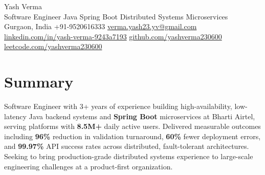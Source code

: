 \documentclass[letterpaper,11pt]{article}
\begin{document}
\begin{center}
  {\Huge Yash Verma} \\
  \small Software Engineer \textperiodcentered{} Java \textperiodcentered{} Spring Boot \textperiodcentered{} Distributed Systems \textperiodcentered{} Microservices \\
  \vspace{8pt}
  \small
  Gurgaon, India \textbar{}
  +91-9520616333 \textbar{}
  \href{mailto:verma.yash23.yv@gmail.com}{verma.yash23.yv@gmail.com} \textbar{}
  \href{https://www.linkedin.com/in/yash-verma-9243a7193/}{linkedin.com/in/yash-verma-9243a7193} \textbar{}
  \href{https://github.com/yashverma230600}{github.com/yashverma230600} \textbar{}
  \href{https://leetcode.com/yashverma230600}{leetcode.com/yashverma230600}
  \vspace{-8pt}
\end{center}

\section{Summary}
\begin{itemize}[leftmargin=0.15in, label={}]
  \small{\item{
    Software Engineer with 3+ years of experience building high-availability, low-latency Java backend systems and \textbf{Spring Boot} microservices at Bharti Airtel, serving platforms with \textbf{8.5M+} daily active users. Delivered measurable outcomes including \textbf{96\%} reduction in validation turnaround, \textbf{60\%} fewer deployment errors, and \textbf{99.97\%} API success rates across distributed, fault-tolerant architectures. Seeking to bring production-grade distributed systems experience to large-scale engineering challenges at a product-first organization.
  }}
\end{itemize}
\vspace{-8pt}

\end{document}
